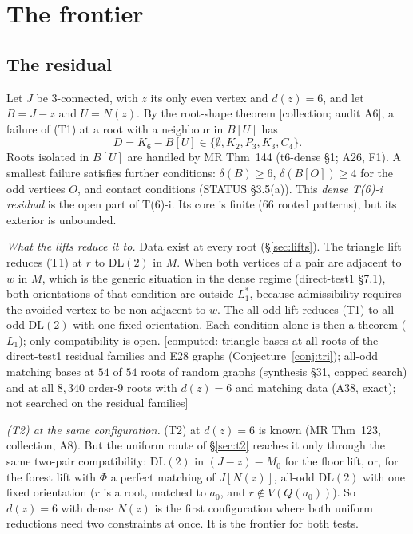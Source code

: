 \documentclass[11pt]{amsart}
\theoremstyle{definition}
\newcommand{\st}[1]{\textsf{\small[#1]}}
\begin{document}
\section{The frontier}\label{sec:frontier}

\subsection{The residual}
Let $J$ be $3$-connected, with $z$ its only even vertex and $d(z)=6$, and let $B=J-z$ and $U=N(z)$. By the
root-shape theorem \st{collection; audit A6}, a failure of (T1) at a root with a neighbour in $B[U]$ has
\[
D=K_6-B[U]\in\{\emptyset,K_2,P_3,K_3,C_4\}.
\]
Roots isolated in $B[U]$ are handled by MR Thm~144 (t6-dense \S1; A26, F1). A smallest failure satisfies
further conditions: $\delta(B)\ge6$, $\delta(B[O])\ge4$ for the odd vertices $O$, and contact conditions
(STATUS \S3.5(a)). This \emph{dense T(6)-i residual} is the open part of T(6)-i. Its core is finite
($66$ rooted patterns), but its exterior is unbounded.

\emph{What the lifts reduce it to.} Data exist at every root (\S\ref{sec:lifts}). The triangle lift
reduces (T1) at $r$ to DL$(2)$ in $M$. When both vertices of a pair are adjacent to $w$ in $M$, which
is the generic situation in the dense regime (direct-test1 \S7.1), both orientations of that condition
are outside $L_1^*$, because admissibility requires the avoided vertex to be non-adjacent to $w$. The all-odd lift
reduces (T1) to all-odd DL$(2)$ with one fixed orientation. Each condition alone is then a theorem
($L_1$);
only compatibility is open. \st{computed: triangle bases at all roots of the direct-test1 residual families and E28 graphs
(Conjecture~\ref{conj:tri}); all-odd matching bases at $54$ of $54$ roots of random graphs (synthesis
\S31, capped search) and at all $8{,}340$ order-$9$ roots with $d(z)=6$ and matching data (A38, exact);
not searched on the residual families}

\emph{(T2) at the same configuration.} (T2) at $d(z)=6$ is known (MR Thm~123, collection, A8). But the
uniform route of \S\ref{sec:t2} reaches it only through the same two-pair compatibility: DL$(2)$ in
$(J-z)-M_0$ for the floor lift, or, for the forest lift with $\Phi$ a perfect matching of $J[N(z)]$,
all-odd DL$(2)$ with one fixed orientation ($r$ is a root, matched to $a_0$, and $r\notin V(Q(a_0))$). So
$d(z)=6$ with dense $N(z)$ is the first configuration where both uniform reductions need two
constraints at once. It is the frontier for both tests.
\end{document}
